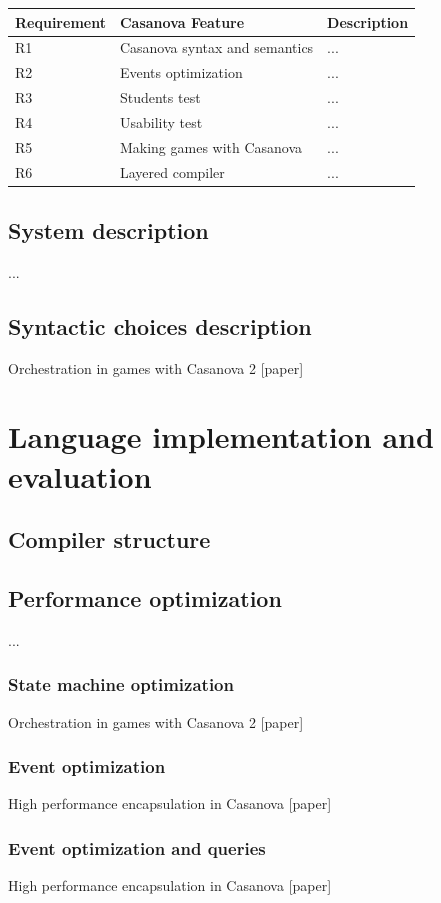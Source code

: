 \documentclass[10pt,a4paper]{book}
\begin{document}
\begin{center}
     \begin{tabular}{ | l | l | p{5cm} |}
     \hline
     Requirement & Casanova Feature & Description \\ \hline
     R1 & Casanova syntax and semantics & ... \\ \hline
     R2 & Events optimization & ... \\ \hline
     R3 & Students test & ... \\ \hline
     R4 & Usability test & ... \\ \hline
     R5 & Making games with Casanova & ... \\ \hline
     R6 & Layered compiler & ... \\ \hline
     \end{tabular}
\end{center}


\section{System description}
...
\section{Syntactic choices description}
Orchestration in games with Casanova 2 [paper]

\chapter{Language implementation and evaluation}
\section{Compiler structure}
\section{Performance optimization}
...
\subsection{State machine optimization}
Orchestration in games with Casanova 2 [paper]
\subsection{Event optimization}
High performance encapsulation in Casanova [paper]
\subsection{Event optimization and queries}
High performance encapsulation in Casanova [paper]
\end{document}
